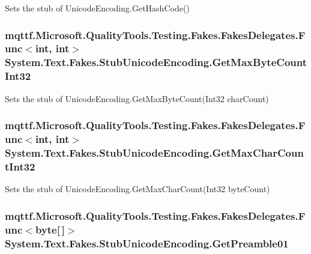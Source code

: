 Sets the stub of Unicode\-Encoding.\-Get\-Hash\-Code()

\hypertarget{class_system_1_1_text_1_1_fakes_1_1_stub_unicode_encoding_ad8b0fe1ca02903a3e739de7a4c13e453}{
\subsubsection[{Get\-Max\-Byte\-Count\-Int32}]{\setlength{\rightskip}{0pt plus 5cm}mqttf.\-Microsoft.\-Quality\-Tools.\-Testing.\-Fakes.\-Fakes\-Delegates.\-Func$<$int, int$>$ System.\-Text.\-Fakes.\-Stub\-Unicode\-Encoding.\-Get\-Max\-Byte\-Count\-Int32}}\label{class_system_1_1_text_1_1_fakes_1_1_stub_unicode_encoding_ad8b0fe1ca02903a3e739de7a4c13e453}


Sets the stub of Unicode\-Encoding.\-Get\-Max\-Byte\-Count(\-Int32 char\-Count)

\hypertarget{class_system_1_1_text_1_1_fakes_1_1_stub_unicode_encoding_aaa2da8c382d0aa33e1a997f162b9ccd5}{
\subsubsection[{Get\-Max\-Char\-Count\-Int32}]{\setlength{\rightskip}{0pt plus 5cm}mqttf.\-Microsoft.\-Quality\-Tools.\-Testing.\-Fakes.\-Fakes\-Delegates.\-Func$<$int, int$>$ System.\-Text.\-Fakes.\-Stub\-Unicode\-Encoding.\-Get\-Max\-Char\-Count\-Int32}}\label{class_system_1_1_text_1_1_fakes_1_1_stub_unicode_encoding_aaa2da8c382d0aa33e1a997f162b9ccd5}


Sets the stub of Unicode\-Encoding.\-Get\-Max\-Char\-Count(\-Int32 byte\-Count)

\hypertarget{class_system_1_1_text_1_1_fakes_1_1_stub_unicode_encoding_a0e709a50a181f6bffa95fee2ffc50e9b}{
\subsubsection[{Get\-Preamble01}]{\setlength{\rightskip}{0pt plus 5cm}mqttf.\-Microsoft.\-Quality\-Tools.\-Testing.\-Fakes.\-Fakes\-Delegates.\-Func$<$byte\mbox{[}$\,$\mbox{]}$>$ System.\-Text.\-Fakes.\-Stub\-Unicode\-Encoding.\-Get\-Preamble01}}\label{class_system_1_1_text_1_1_fakes_1_1_stub_unicode_encoding_a0e709a50a181f6bffa95fee2ffc50e9b}


